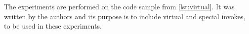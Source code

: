 The experiments are performed on the code sample from \cref{lst:virtual}. It was written by the authors and its purpose is to include virtual and special invokes, to be used in these experiments.\\\\